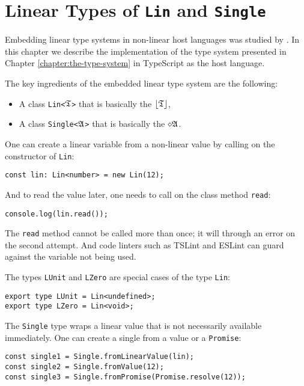\section{Linear Types of \texttt{Lin} and \texttt{Single}}

Embedding linear type systems in non-linear host languages was studied by \cite{JenniferPaykin2018}. In this chapter we describe the implementation of the type system presented in Chapter \ref{chapter:the-type-system} in TypeScript as the host language.

The key ingredients of the embedded linear type system are the following:
\begin{itemize}
    \item A class \texttt{Lin<}$\mathfrak{T}$\texttt{>} that is basically the $\left\lfloor \mathfrak{T} \right\rfloor$,
    \item A class \texttt{Single<}$\mathfrak{A}$\texttt{>} that is basically the $\diamond\mathfrak{A}$.
\end{itemize}

One can create a linear variable from a non-linear value by calling on the constructor of \texttt{Lin}:

\begin{verbatim}
const lin: Lin<number> = new Lin(12);
\end{verbatim}

And to read the value later, one needs to call on the class method \texttt{read}:

\begin{verbatim}
console.log(lin.read());
\end{verbatim}

The \texttt{read} method cannot be called more than once; it will through an error on the second attempt. And code linters such as TSLint and ESLint can guard against the variable not being used.

The types \texttt{LUnit} and \texttt{LZero} are special cases of the type \texttt{Lin}:

\begin{verbatim}
export type LUnit = Lin<undefined>;
export type LZero = Lin<void>;
\end{verbatim}

The \texttt{Single} type wraps a linear value that is not necessarily available immediately. One can create a single from a value or a \texttt{Promise}:

\begin{verbatim}
const single1 = Single.fromLinearValue(lin);
const single2 = Single.fromValue(12);
const single3 = Single.fromPromise(Promise.resolve(12));
\end{verbatim}

